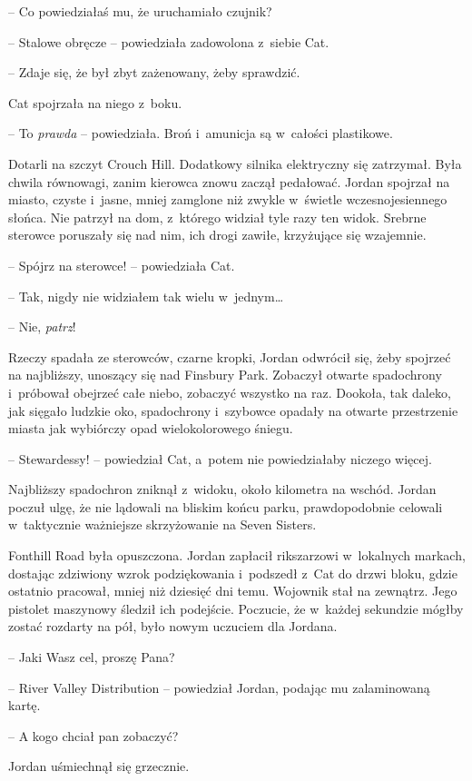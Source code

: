 \documentclass[oneside,polish,11pt,sfheadings]{mwbk}
\begin{document}
-- Co powiedziałaś mu, że uruchamiało czujnik?

-- Stalowe obręcze -- powiedziała zadowolona z~siebie Cat.

-- Zdaje się, że był zbyt zażenowany, żeby sprawdzić.

Cat spojrzała na niego z~boku. 

-- To \emph{prawda} -- powiedziała. Broń i~amunicja są w~całości plastikowe.

Dotarli na szczyt Crouch Hill. Dodatkowy silnika elektryczny się
zatrzymał. Była chwila równowagi, zanim kierowca znowu zaczął pedałować.
Jordan spojrzał na miasto, czyste i~jasne, mniej zamglone niż zwykle w~świetle wczesnojesiennego słońca. Nie patrzył na dom, z~którego widział
tyle razy ten widok. Srebrne sterowce poruszały się nad nim, ich drogi
zawiłe, krzyżujące się wzajemnie.

-- Spójrz na sterowce! -- powiedziała Cat.

-- Tak, nigdy nie widziałem tak wielu w~jednym\ldots

-- Nie, \emph{patrz}!

Rzeczy spadała ze sterowców, czarne kropki, Jordan odwrócił się, żeby
spojrzeć na najbliższy, unoszący się nad Finsbury Park. Zobaczył otwarte
spadochrony i~próbował obejrzeć całe niebo, zobaczyć wszystko na raz.
Dookoła, tak daleko, jak sięgało ludzkie oko, spadochrony i~szybowce
opadały na otwarte przestrzenie miasta jak wybiórczy opad
wielokolorowego śniegu.

-- Stewardessy! -- powiedział Cat, a~potem nie powiedziałaby niczego
więcej.

Najbliższy spadochron zniknął z~widoku, około kilometra na wschód.
Jordan poczuł ulgę, że nie lądowali na bliskim końcu parku,
prawdopodobnie celowali w~taktycznie ważniejsze skrzyżowanie na Seven
Sisters.

Fonthill Road była opuszczona. Jordan zapłacił rikszarzowi w~lokalnych
markach, dostając zdziwiony wzrok podziękowania i~podszedł z~Cat do
drzwi bloku, gdzie ostatnio pracował, mniej niż dziesięć dni temu.
Wojownik stał na zewnątrz. Jego pistolet maszynowy śledził ich
podejście. Poczucie, że w~każdej sekundzie mógłby zostać rozdarty na
pół, było nowym uczuciem dla Jordana.

-- Jaki Wasz cel, proszę Pana?

-- River Valley Distribution -- powiedział Jordan, podając mu zalaminowaną
kartę.

-- A kogo chciał pan zobaczyć?

Jordan uśmiechnął się grzecznie. 
\end{document}
